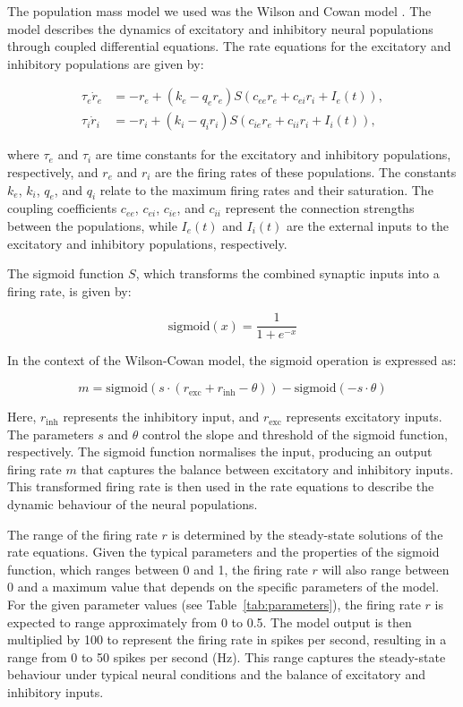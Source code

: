 \documentclass[12pt]{article}
\begin{document}
The population mass model we used was the Wilson and Cowan model \autocite{wilsonExcitatoryInhibitoryInteractions1972}. The model describes the dynamics of excitatory and inhibitory neural populations through coupled differential equations. The rate equations for the excitatory and inhibitory populations are given by:

\[
\begin{aligned}
\tau_e \dot{r}_e &= -r_e + (k_e - q_e r_e) S(c_{ee} r_e + c_{ei} r_i + I_e(t)), \\
\tau_i \dot{r}_i &= -r_i + (k_i - q_i r_i) S(c_{ie} r_e + c_{ii} r_i + I_i(t)),
\end{aligned}
\]

where \( \tau_e \) and \( \tau_i \) are time constants for the excitatory and inhibitory populations, respectively, and \( r_e \) and \( r_i \) are the firing rates of these populations. The constants \( k_e \), \( k_i \), \( q_e \), and \( q_i \) relate to the maximum firing rates and their saturation. The coupling coefficients \( c_{ee} \), \( c_{ei} \), \( c_{ie} \), and \( c_{ii} \) represent the connection strengths between the populations, while \( I_e(t) \) and \( I_i(t) \) are the external inputs to the excitatory and inhibitory populations, respectively.

The sigmoid function \( S \), which transforms the combined synaptic inputs into a firing rate, is given by:

\[
\text{sigmoid}(x) = \frac{1}{1 + e^{-x}}
\]

In the context of the Wilson-Cowan model, the sigmoid operation is expressed as:

\[
m = \text{sigmoid}(s \cdot (r_{\text{exc}} + r_{\text{inh}} - \theta)) - \text{sigmoid}(-s \cdot \theta)
\]

Here, \( r_{\text{inh}} \) represents the inhibitory input, and \( r_{\text{exc}} \) represents excitatory inputs. The parameters \( s \) and \( \theta \) control the slope and threshold of the sigmoid function, respectively. The sigmoid function normalises the input, producing an output firing rate \( m \) that captures the balance between excitatory and inhibitory inputs. This transformed firing rate is then used in the rate equations to describe the dynamic behaviour of the neural populations.

The range of the firing rate \( r \) is determined by the steady-state solutions of the rate equations. Given the typical parameters and the properties of the sigmoid function, which ranges between 0 and 1, the firing rate \( r \) will also range between 0 and a maximum value that depends on the specific parameters of the model. For the given parameter values (see Table~\ref{tab:parameters}), the firing rate \( r \) is expected to range approximately from 0 to 0.5. The model output is then multiplied by 100 to represent the firing rate in spikes per second, resulting in a range from 0 to 50 spikes per second (Hz). This range captures the steady-state behaviour under typical neural conditions and the balance of excitatory and inhibitory inputs.
\end{document}
